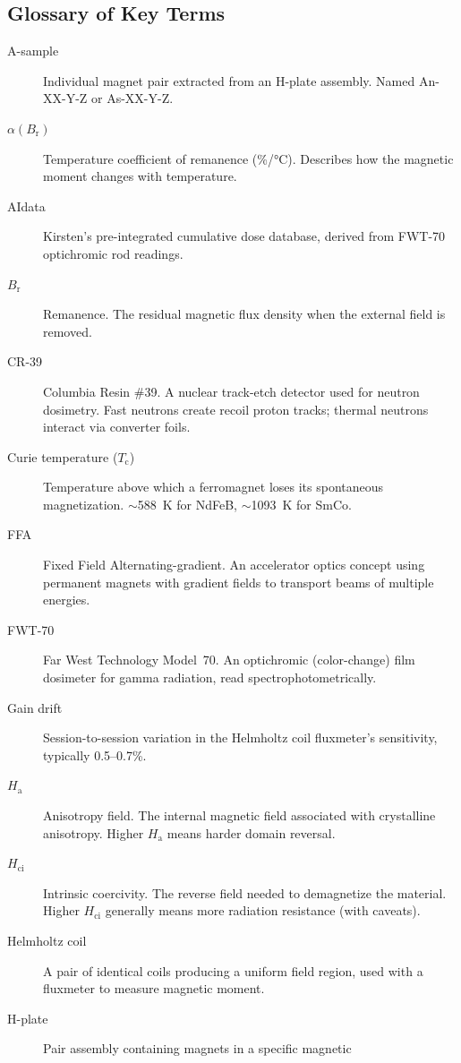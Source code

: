 \documentclass[11pt,letterpaper]{article}
\newcommand{\Tc}{T_\mathrm{c}}
\newcommand{\Ha}{H_\mathrm{a}}
\newcommand{\Hci}{H_\mathrm{ci}}
\newcommand{\Br}{B_\mathrm{r}}
\newcommand{\alphar}{\alpha(\Br)}
\begin{document}
\begin{appendices}
\section{Glossary of Key Terms}
\label{app:glossary}

\begin{description}
    \item[A-sample] Individual magnet pair extracted from an H-plate assembly.
    Named An-XX-Y-Z or As-XX-Y-Z.
    \item[$\alphar$] Temperature coefficient of remanence (\%/\si{\celsius}).
    Describes how the magnetic moment changes with temperature.
    \item[AIdata] Kirsten's pre-integrated cumulative dose database, derived
    from FWT-70 optichromic rod readings.
    \item[$\Br$] Remanence. The residual magnetic flux density when the
    external field is removed.
    \item[CR-39] Columbia Resin \#39. A nuclear track-etch detector used for
    neutron dosimetry. Fast neutrons create recoil proton tracks; thermal
    neutrons interact via converter foils.
    \item[Curie temperature ($\Tc$)] Temperature above which a ferromagnet
    loses its spontaneous magnetization. $\sim$\SI{588}{K} for NdFeB,
    $\sim$\SI{1093}{K} for SmCo.
    \item[FFA] Fixed Field Alternating-gradient. An accelerator optics concept
    using permanent magnets with gradient fields to transport beams of
    multiple energies.
    \item[FWT-70] Far West Technology Model~70. An optichromic (color-change)
    film dosimeter for gamma radiation, read spectrophotometrically.
    \item[Gain drift] Session-to-session variation in the Helmholtz coil
    fluxmeter's sensitivity, typically 0.5--0.7\%.
    \item[$\Ha$] Anisotropy field. The internal magnetic field associated with
    crystalline anisotropy. Higher $\Ha$ means harder domain reversal.
    \item[$\Hci$] Intrinsic coercivity. The reverse field needed to
    demagnetize the material. Higher $\Hci$ generally means more radiation
    resistance (with caveats).
    \item[Helmholtz coil] A pair of identical coils producing a uniform field
    region, used with a fluxmeter to measure magnetic moment.
    \item[H-plate] Pair assembly containing magnets in a specific magnetic

\end{description}
\end{appendices}
\end{document}
